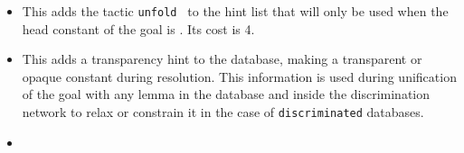 \begin{itemize}
\begin{ErrMsgs}

  \end{ErrMsgs}


\item {}

  This adds the tactic {\tt unfold {\qualid}} to the hint list that
  will only be used when the head constant of the goal is \ident.  Its
  cost is 4.


\item {}
\label{HintTransparency}

  This adds a transparency hint to the database, making {\tt {\qualid}}
  a transparent or opaque constant during resolution. This information
  is used during unification of the goal with any lemma in the database
  and inside the discrimination network to relax or constrain it in the
  case of \texttt{discriminated} databases.


\item {}


\end{itemize}
